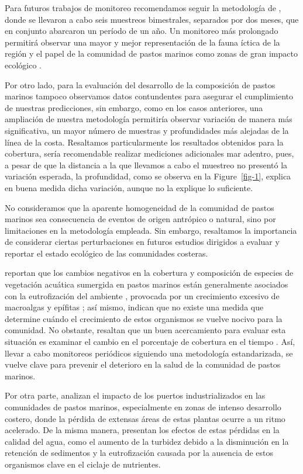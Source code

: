 \documentclass[
  authoryear,
  preprint,
  3p,
  twocolumn]{elsarticle}
\begin{document}
Para futuros trabajos de monitoreo recomendamos seguir la metodología de
\citet{ArceoCarranza2009}, donde se llevaron a cabo seis muestreos
bimestrales, separados por dos meses, que en conjunto abarcaron un
período de un año. Un monitoreo más prolongado permitirá observar una
mayor y mejor representación de la fauna íctica de la región y el papel
de la comunidad de pastos marinos como zonas de gran impacto ecológico
\citep{CATALAN_DUNAND_ÁLVAREZ_ALOS_COLINAS_NASH_2014}.

Por otro lado, para la evaluación del desarrollo de la composición de
pastos marinos tampoco observamos datos contundentes para asegurar el
cumplimiento de nuestras predicciones, sin embargo, como en los casos
anteriores, una ampliación de nuestra metodología permitiría observar
variación de manera más significativa, un mayor número de muestras y
profundidades más alejadas de la línea de la costa. Resaltamos
particularmente los resultados obtenidos para la cobertura, sería
recomendable realizar mediciones adicionales mar adentro, pues, a pesar
de que la distancia a la que llevamos a cabo el muestreo no presentó la
variación esperada, la profundidad, como se observa en la
Figure~\ref{fig-1}, explica en buena medida dicha variación, aunque no
la explique lo suficiente.

No consideramos que la aparente homogeneidad de la comunidad de pastos
marinos sea consecuencia de eventos de origen antrópico o natural, sino
por limitaciones en la metodología empleada. Sin embargo, resaltamos la
importancia de considerar ciertas perturbaciones en futuros estudios
dirigidos a evaluar y reportar el estado ecológico de las comunidades
costeras.

\citet{HERRERASILVEIRA200972} reportan que los cambios negativos en la
cobertura y composición de especies de vegetación acuática sumergida en
pastos marinos están generalmente asociados con la eutrofización del
ambiente \citep{OrthMoore1983, Stevenson1993}, provocada por un
crecimiento excesivo de macroalgas y epífitas \citep{Dennison1993}; así
mismo, indican que no existe una medida que determine cuándo el
crecimiento de estos organismos se vuelve nocivo para la comunidad. No
obstante, resaltan que un buen acercamiento para evaluar esta situación
es examinar el cambio en el porcentaje de cobertura en el tiempo
\citep{Bricker2003}. Así, llevar a cabo monitoreos periódicos siguiendo
una metodología estandarizada, se vuelve clave para prevenir el
deterioro en la salud de la comunidad de pastos marinos.

Por otra parte, \citet{Herrera-Silveira2019} analizan el impacto de los
puertos industrializados en las comunidades de pastos marinos,
especialmente en zonas de intenso desarrollo costero, donde la pérdida
de extensas áreas de estas plantas ocurre a un ritmo acelerado. De la
misma manera, presentan los efectos de estas pérdidas en la calidad del
agua, como el aumento de la turbidez debido a la disminución en la
retención de sedimentos y la eutrofización causada por la ausencia de
estos organismos clave en el ciclaje de nutrientes.
\end{document}
